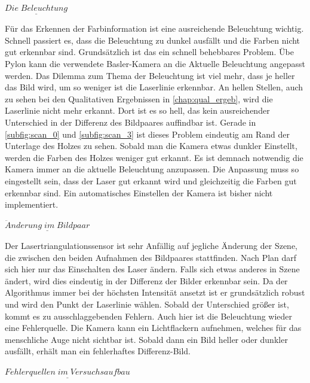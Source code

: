 		$\underline{Die \; Beleuchtung}$
		
		Für das Erkennen der Farbinformation ist eine ausreichende Beleuchtung wichtig. Schnell passiert es, dass die Beleuchtung zu dunkel ausfällt und die Farben nicht gut erkennbar sind. Grundsätzlich ist das ein schnell behebbares Problem. Übe Pylon kann die verwendete Basler-Kamera an die Aktuelle Beleuchtung angepasst werden. Das Dilemma zum Thema der Beleuchtung ist viel mehr, dass je heller das Bild wird, um so weniger ist die Laserlinie erkennbar. An hellen Stellen, auch zu sehen bei den Qualitativen Ergebnissen in \ref{chap:qual_ergeb}, wird die Laserlinie nicht mehr erkannt. Dort ist es so hell, das kein ausreichender Unterschied in der Differenz des Bildpaares auffindbar ist. Gerade in \ref{subfig:scan_0} und \ref{subfig:scan_3} ist dieses Problem eindeutig am Rand der Unterlage des Holzes zu sehen. Sobald man die Kamera etwas dunkler Einstellt, werden die Farben des Holzes weniger gut erkannt. Es ist demnach notwendig die Kamera immer an die aktuelle Beleuchtung anzupassen. Die Anpassung muss so eingestellt sein, dass der Laser gut erkannt wird und gleichzeitig die Farben gut erkennbar sind. Ein automatisches Einstellen der Kamera ist bisher nicht implementiert.
		
		$\underline{\ddot{A}nderung \; im \; Bildpaar}$
		
		Der Lasertriangulationssensor ist sehr Anfällig auf jegliche Änderung der Szene, die zwischen den beiden Aufnahmen des Bildpaares stattfinden. Nach Plan darf sich hier nur das Einschalten des Laser ändern. Falls sich etwas anderes in Szene ändert, wird dies eindeutig in der Differenz der Bilder erkennbar sein. Da der Algorithmus immer bei der höchsten Intensität ansetzt ist er grundsätzlich robust und wird den Punkt der Laserlinie wählen. Sobald der Unterschied größer ist, kommt es zu ausschlaggebenden Fehlern. Auch hier ist die Beleuchtung wieder eine Fehlerquelle. Die Kamera kann ein Lichtflackern aufnehmen, welches für das menschliche Auge nicht sichtbar ist. Sobald dann ein Bild heller oder dunkler ausfällt, erhält man ein fehlerhaftes Differenz-Bild.
		
		$\underline{Fehlerquellen \; im \; Versuchsaufbau}$
		
